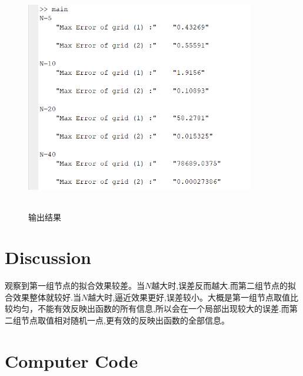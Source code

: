 \documentclass{article}
\begin{document}
	\begin{figure}[p]
	\begin{center}
		
		\includegraphics[width=10cm,height=10cm]{result}
		
		\caption{输出结果} \label{figure.label}
	\end{center}
\end{figure}

    
    \section{Discussion}
    
    
    观察到第一组节点的拟合效果较差。当$N$越大时,误差反而越大.而第二组节点的拟合效果整体就较好.当$N$越大时,逼近效果更好,误差较小。大概是第一组节点取值比较均匀，不能有效反映出函数的所有信息,所以会在一个局部出现较大的误差.而第二组节点取值相对随机一点,更有效的反映出函数的全部信息。
    
    \section{Computer Code}
    
    
    
    
\end{document}
